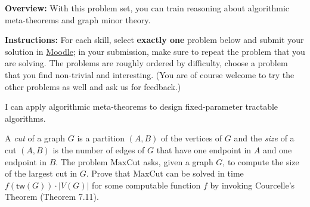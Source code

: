 \documentclass[english]{uebung_cs}
\begin{document}
\textbf{Overview:} With this problem set, you can train reasoning about algorithmic meta-theorems and graph minor theory.

\textbf{Instructions:} For each skill, select \textbf{exactly one} problem below and submit your solution in \href{https://moodle.studiumdigitale.uni-frankfurt.de/moodle/course/view.php?id=6259}{Moodle}; in your submission, make sure to repeat the problem that you are solving.
The problems are roughly ordered by difficulty, choose a problem that you find non-trivial and interesting. (You are of course welcome to try the other problems as well and ask us for feedback.)



\begin{skill}
  I can apply algorithmic meta-theorems to design fixed-parameter tractable algorithms.
\end{skill}

\begin{exercise}
  A \emph{cut} of a graph $G$ is a partition $(A,B)$ of the vertices of $G$ and the \emph{size} of a cut $(A,B)$ is the number of edges of $G$ that have one endpoint in $A$ and one endpoint in $B$. The problem $\mathrm{MaxCut}$ asks, given a graph $G$, to compute the size of the largest cut in $G$. Prove that $\mathrm{MaxCut}$ can be solved in time $f(\mathsf{tw}(G)) \cdot |V(G)|$ for some computable function $f$ by invoking Courcelle's Theorem (Theorem 7.11).
\end{exercise}
\end{document}
